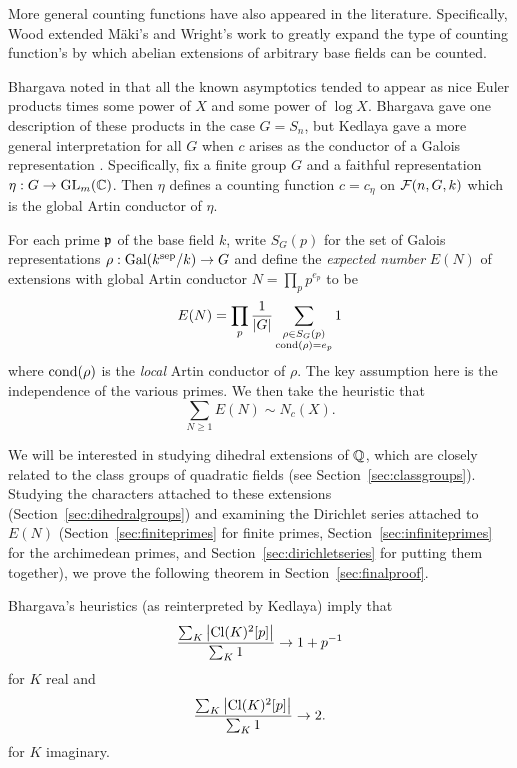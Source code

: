 More general counting functions have also appeared in the literature.
Specifically, Wood extended M\"aki's and Wright's work \cite{melaniemass} to
greatly expand the type of counting function's by which abelian extensions of
arbitrary base fields can be counted.

Bhargava noted in \cite{bhargavamass} that all the known asymptotics tended to
appear as nice Euler products times some power of $X$ and some power of $\log
X$. Bhargava gave one description of these products in the case $G = S_n$, but
Kedlaya gave a more general interpretation for all $G$ when $c$ arises as the
conductor of a Galois representation \cite{kedlayamass}.  Specifically, fix a
finite group $G$ and a faithful representation $\eta: G \to \operatorname{GL}_m(\mathbb{C})$. Then
$\eta$ defines a counting function $c = c_\eta$ on $\mathcal{F}(n, G, k)$ which is the
global Artin conductor of $\eta$.

For each prime $\mathfrak{p}$ of the base field $k$, write $S_G(p)$ for the set of
Galois representations $\rho : \operatorname{Gal}(k^{\mathrm{sep}}/k) \to G$ and define the
{\em expected number} $E(N)$ of extensions with global Artin conductor $N =
\prod_p p^{e_p}$ to be \[ E(N) = \prod_p \frac{1}{|G|} \sum_{\substack{\rho \in
S_G(p) \\ \operatorname{cond}(\rho) = e_p}} 1 \] where $\operatorname{cond}(\rho)$ is the {\em local} Artin
conductor of $\rho$. The key assumption here is the independence of the various
primes. We then take the heuristic that
\[ \sum_{N \geq 1} E(N) \sim N_c(X). \]

We will be interested in studying dihedral extensions of $\mathbb{Q}$, which are
closely related to the class groups of quadratic fields (see
Section~\ref{sec:classgroups}).  Studying the characters attached to these
extensions (Section~\ref{sec:dihedralgroups}) and examining the Dirichlet
series attached to $E(N)$ (Section~\ref{sec:finiteprimes} for finite primes,
Section~\ref{sec:infiniteprimes} for the archimedean primes, and
Section~\ref{sec:dirichletseries} for putting them together), we prove the
following theorem in Section~\ref{sec:finalproof}.

\begin{thm}\label{thm:main}
  Bhargava's heuristics (as reinterpreted by Kedlaya) imply that
  \[ \frac{\sum_K \left| \operatorname{Cl}(K)^2[p] \right|}{\sum_K 1} \to 1 + p^{-1} \]
  for $K$ real and
  \[ \frac{\sum_K \left| \operatorname{Cl}(K)^2[p] \right|}{\sum_K 1} \to 2. \]
  for $K$ imaginary.
\end{thm}
